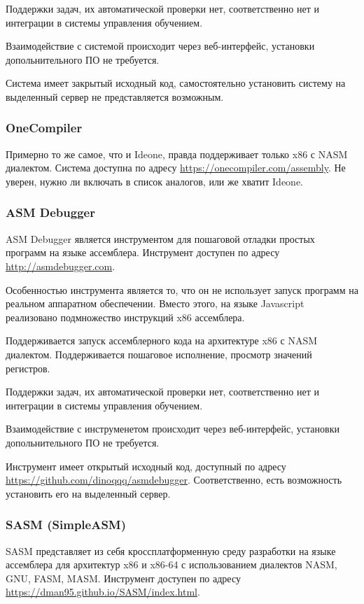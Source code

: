 \documentclass[a4paper,article,14pt]{extarticle}
\begin{document}
Поддержки задач, их автоматической проверки нет, соответственно нет и интеграции в системы управления обучением.

Взаимодействие с системой происходит через веб-интерфейс, установки допольнительного ПО не требуется.

Система имеет закрытый исходный код, самостоятельно установить систему на выделенный сервер не представляется возможным.

\subsubsection{OneCompiler}

Примерно то же самое, что и Ideone, правда поддерживает только x86 с NASM диалектом. Система доступна по адресу \url{https://onecompiler.com/assembly}. Не уверен, нужно ли включать в список аналогов, или же хватит Ideone.

\subsubsection{ASM Debugger}

ASM Debugger является инструментом для пошаговой отладки простых программ на языке ассемблера. Инструмент доступен по адресу \url{http://asmdebugger.com}.

Особенностью инструмента является то, что он не использует запуск программ на реальном аппаратном обеспечении. Вместо этого, на языке Javascript реализовано подмножество инструкций x86 ассемблера.

Поддерживается запуск ассемблерного кода на архитектуре x86 с NASM диалектом. Поддерживается пошаговое исполнение, просмотр значений регистров.

Поддержки задач, их автоматической проверки нет, соответственно нет и интеграции в системы управления обучением.

Взаимодействие с инструменетом происходит через веб-интерфейс, установки допольнительного ПО не требуется.

Инструмент имеет открытый исходный код, доступный по адресу \url{https://github.com/dinoqqq/asmdebugger}. Соответственно, есть возможность установить его на выделенный сервер.

\subsubsection{SASM (SimpleASM)}

SASM представляет из себя кроссплатформенную среду разработки на языке ассемблера для архитектур x86 и x86-64 с использованием диалектов NASM, GNU, FASM, MASM. Инструмент доступен по адресу \url{https://dman95.github.io/SASM/index.html}.
\end{document}
